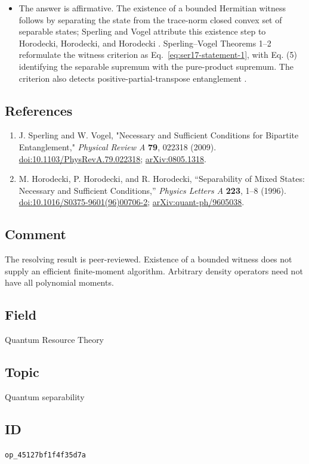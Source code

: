 \begin{itemize}
  \item The answer is affirmative. The existence of a bounded Hermitian witness follows by separating the state from the trace-norm closed convex set of separable states; Sperling and Vogel attribute this existence step to Horodecki, Horodecki, and Horodecki . Sperling--Vogel Theorems 1--2 reformulate the witness criterion as Eq.~\eqref{eq:ser17-statement-1}, with Eq. (5) identifying the separable supremum with the pure-product supremum. The criterion also detects positive-partial-transpose entanglement .
\end{itemize}

\subsection*{References}

\begin{enumerate}[label={},leftmargin=4.8em,labelsep=0.5em]
  \footnotesize
  \item[\textup{[SV09]}]\label{ref:ser17-1}
  J. Sperling and W. Vogel, "Necessary and Sufficient Conditions for Bipartite Entanglement," \emph{Physical Review A} \textbf{79}, 022318 (2009). \href{https://doi.org/10.1103/PhysRevA.79.022318}{doi:10.1103/PhysRevA.79.022318}; \href{https://arxiv.org/abs/0805.1318}{arXiv:0805.1318}.

  \item[\textup{[HHH96]}]\label{ref:ser17-horodecki}
  M. Horodecki, P. Horodecki, and R. Horodecki, ``Separability of Mixed States: Necessary and Sufficient Conditions,'' \emph{Physics Letters A} \textbf{223}, 1--8 (1996). \href{https://doi.org/10.1016/S0375-9601(96)00706-2}{doi:10.1016/S0375-9601(96)00706-2}; \href{https://arxiv.org/abs/quant-ph/9605038}{arXiv:quant-ph/9605038}.
\end{enumerate}

\subsection*{Comment}

The resolving result is peer-reviewed. Existence of a bounded witness does not supply an efficient finite-moment algorithm. Arbitrary density operators need not have all polynomial moments.

\subsection*{Field}

Quantum Resource Theory

\subsection*{Topic}

Quantum separability

\subsection*{ID}

\texttt{op\_45127bf1f4f35d7a}
